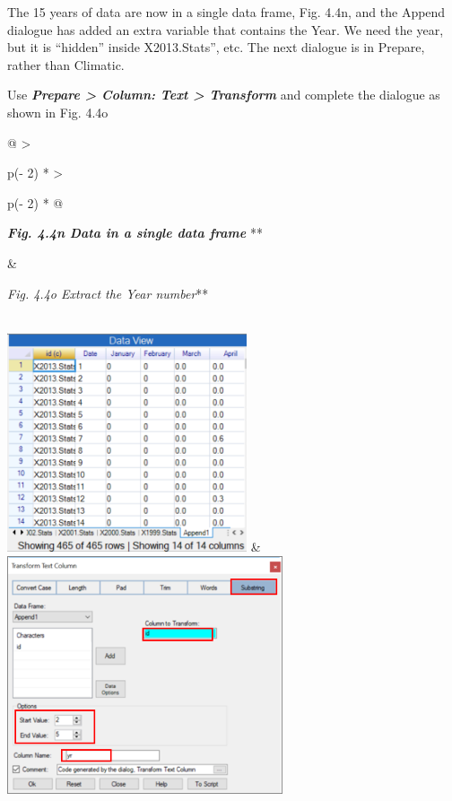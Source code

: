 \documentclass[
  letterpaper,
  DIV=11,
  numbers=noendperiod]{scrreprt}
\begin{document}
The 15 years of data are now in a single data frame, Fig. 4.4n, and the
Append dialogue has added an extra variable that contains the Year. We
need the year, but it is ``hidden'' inside X2013.Stats'', etc. The next
dialogue is in Prepare, rather than Climatic.

Use \textbf{\emph{Prepare \textgreater{} Column: Text \textgreater{}
Transform}} and complete the dialogue as shown in Fig. 4.4o

\begin{longtable}[]{@{}
  >{\raggedright\arraybackslash}p{(\columnwidth - 2\tabcolsep) * }
  >{\raggedright\arraybackslash}p{(\columnwidth - 2\tabcolsep) * }@{}}
\toprule\noalign{}
\begin{minipage}[b]{\linewidth}\raggedright
\textbf{\emph{Fig. 4.4n Data in a single data frame}} **
\end{minipage} & \begin{minipage}[b]{\linewidth}\raggedright
\emph{Fig. 4.4o Extract the Year number}**
\end{minipage} \\
\midrule\noalign{}
\endhead
\bottomrule\noalign{}
\endlastfoot
\includegraphics[width=2.78174in,height=2.53985in]{figures/Fig4.4n.png}
&
\includegraphics[width=3.19492in,height=2.77211in]{figures/Fig4.4o.png} \\
\end{longtable}
\end{document}
